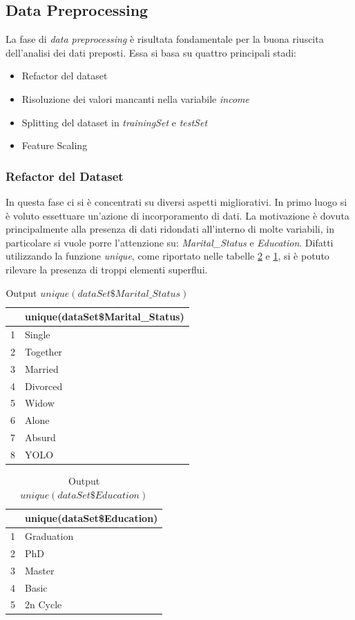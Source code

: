\documentclass[letterpaper,11pt]{article}
\begin{document}
\newpage

\subsection{Data Preprocessing}
La fase di \textit{data preprocessing} è risultata fondamentale per la buona riuscita dell'analisi dei dati preposti. Essa si basa su quattro principali stadi:
\begin{itemize}
    \item Refactor del dataset
    \item Risoluzione dei valori mancanti nella variabile \textit{income}
    \item Splitting del dataset in \textit{trainingSet} e \textit{testSet}
    \item Feature Scaling
\end{itemize}
\subsubsection{Refactor del Dataset}
In questa fase ci si è concentrati su diversi aspetti migliorativi. In primo luogo si è voluto essettuare un'azione di incorporamento di dati. La motivazione è dovuta principalmente alla presenza di dati ridondati all'interno di molte variabili, in particolare si vuole porre l'attenzione su: \textit{Marital\_Status} e \textit{Education}. Difatti utilizzando la funzione \textit{unique}, come riportato nelle tabelle \ref{fig:unique(dataSetEducation)} e \ref{fig:unique(dataSetMaritalStatus)}, si è potuto rilevare la presenza di troppi elementi superflui.
\begin{table}[H]
\centering
\begin{tabular}{rl}
  \hline
 & unique(dataSet\$Marital\_Status) \\ 
  \hline
1 & Single \\ 
  2 & Together \\ 
  3 & Married \\ 
  4 & Divorced \\ 
  5 & Widow \\ 
  6 & Alone \\ 
  7 & Absurd \\ 
  8 & YOLO \\ 
  \hline
\end{tabular}
\caption{Output $unique(dataSet\$Marital\_Status)$}
\label{fig:unique(dataSetMaritalStatus)}
\end{table}

\begin{table}[H]
\centering
\begin{tabular}{rl}
  \hline
 & unique(dataSet\$Education) \\ 
  \hline
1 & Graduation \\ 
  2 & PhD \\ 
  3 & Master \\ 
  4 & Basic \\ 
  5 & 2n Cycle \\ 
  \hline
\end{tabular}
\caption{Output $unique(dataSet\$Education)$}
\label{fig:unique(dataSetEducation)}
\end{table}
\end{document}
